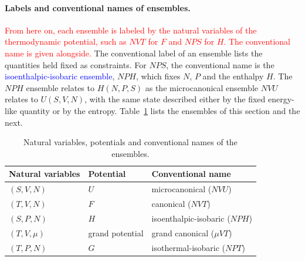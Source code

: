 \paragraph{Labels and conventional names of ensembles.}
\textcolor{red}{From here on, each ensemble is labeled by the natural
variables of the thermodynamic potential, such as $NVT$ for $F$ and $NPS$
for $H$. The conventional name is given alongside.}
The conventional label of an ensemble lists the quantities held fixed as
constraints. For $NPS$, the conventional name is the
\textcolor{blue}{isoenthalpic-isobaric ensemble}, $NPH$, which fixes $N$,
$P$ and the enthalpy $H$. The $NPH$ ensemble relates to $H(N,P,S)$ as the
microcanonical ensemble $NVU$ relates to $U(S,V,N)$, with the same state
described either by the fixed energy-like quantity or by the entropy.
Table~\ref{tab:ensembles} lists the ensembles of this section and the next.
\begin{table}[h]
\centering
\caption{Natural variables, potentials and conventional names of the ensembles.}
\label{tab:ensembles}
\begin{tabular}{lll}
    Natural variables & Potential & Conventional name \\ \hline
    $(S,V,N)$ & $U$ & microcanonical ($NVU$) \\
    $(T,V,N)$ & $F$ & canonical ($NVT$) \\
    $(S,P,N)$ & $H$ & isoenthalpic-isobaric ($NPH$) \\
    $(T,V,\mu)$ & grand potential & grand canonical ($\mu VT$) \\
    $(T,P,N)$ & $G$ & isothermal-isobaric ($NPT$) \\
\end{tabular}
\end{table}
